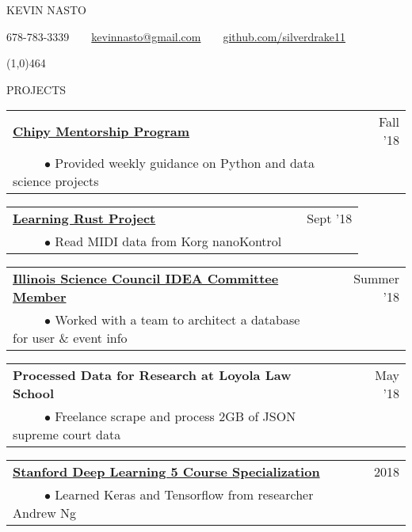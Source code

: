 \documentclass[12pt]{article}
\begin{document}
{\LARGE KEVIN NASTO}

678-78\vphantom{x}3-3339~~\textbullet~~\href{mailto:***REMOVED***}{kevin\vphantom{x}nast\vphantom{x}o@g\vphantom{x}mail.com}~~\textbullet~~\href{https://github.com/silverdrake11}{github.com/silverdrake11}

\line(1,0){464}
\vspace{.8cm}


{PROJECTS}
\vspace {0.4cm}

\begin{tabularx}{\linewidth}{l X r}
\textbf{\href{https://chipymentor.org/}{Chipy Mentorship Program}} & & Fall '18 \\
~~~~~$\bullet$ Provided weekly guidance on Python and data science projects\\
\end{tabularx}

\begin{tabularx}{\linewidth}{l X r}
\textbf{\href{https://github.com/silverdrake11/rustkontrol/blob/master/src/main.rs}{Learning Rust Project}} & & Sept '18 \\
~~~~~$\bullet$ Read MIDI data from Korg nanoKontrol\\
\end{tabularx}

\begin{tabularx}{\linewidth}{l X r}
\textbf{\href{http://www.illinoisscience.org/about-2/associates-board/}{Illinois Science Council IDEA Committee Member}} & & Summer '18 \\
~~~~~$\bullet$ Worked with a team to architect a database for user \& event info\\
\end{tabularx}

\begin{tabularx}{\linewidth}{l X r}
\textbf{Processed Data for Research at Loyola Law School} & & May '18 \\
~~~~~$\bullet$ Freelance scrape and process 2GB of JSON supreme court data\\
\end{tabularx}

\begin{tabularx}{\linewidth}{l X r}
\textbf{\href{https://www.coursera.org/account/accomplishments/specialization/certificate/DYW5MPE86QH7}{Stanford Deep Learning 5 Course Specialization}} & & 2018 \\
~~~~~$\bullet$ Learned Keras and Tensorflow from researcher Andrew Ng\\
\end{tabularx}
\end{document}
